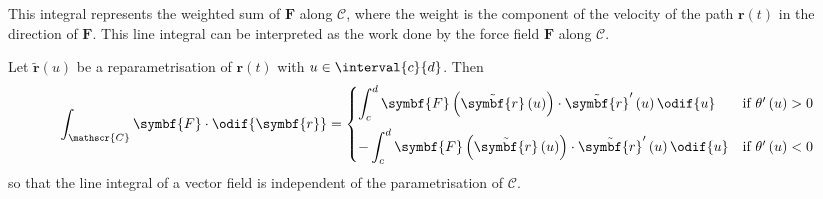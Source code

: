 \documentclass{article}
\begin{document}
This integral represents the weighted sum of \(\symbf{F}\) along
\(\mathscr{C}\), where the weight is the component of the velocity of
the path \(\symbf{r}\left( t \right)\) in the direction of
\(\symbf{F}\). This line integral can be interpreted as the work done
by the force field \(\symbf{F}\) along \(\mathscr{C}\).
\begin{lemma}
    Let \(\tilde{\symbf{r}}\left( u \right)\) be a
    reparametrisation of \(\symbf{r}\left( t \right)\) with \(u \in
    \interval{c}{d}\). Then
    \begin{equation*}
        \int_{\mathscr{C}} \symbf{F} \cdot \odif{\symbf{r}} =
        \begin{cases}
            \displaystyle\int_c^d \symbf{F}\left( \tilde{\symbf{r}}\left( u \right) \right) \cdot \tilde{\symbf{r}}'\left( u \right) \odif{u}  & \text{if } \theta'\left( u \right) > 0 \\[2.5ex]
            -\displaystyle\int_c^d \symbf{F}\left( \tilde{\symbf{r}}\left( u \right) \right) \cdot \tilde{\symbf{r}}'\left( u \right) \odif{u} & \text{if } \theta'\left( u \right) < 0
        \end{cases}
    \end{equation*}
    so that the line integral of a vector field is independent of the
    parametrisation of \(\mathscr{C}\).
\end{lemma}
\end{document}
